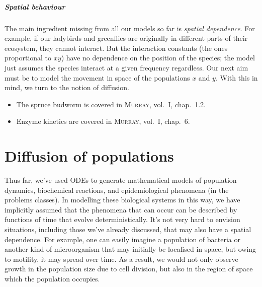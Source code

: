 \documentclass[main.tex]{subfiles}
\begin{document}
\paragraph{Spatial behaviour}
The main ingredient missing from all our models so far is \emph{spatial dependence}. For example, if our ladybirds and greenflies are originally in different parts of their ecosystem, they cannot interact. But the interaction constants (the ones proportional to $xy$) have no dependence on the position of the species; the model just assumes the species interact at a given frequency regardless. Our next aim must be to model the movement in space of the populations $x$ and $y$. With this in mind, we turn to the notion of diffusion.

\begin{extra-reading}
\begin{itemize}
	\item The spruce budworm is covered in \textsc{Murray}, vol.~I, chap.~1.2.
	\item Enzyme kinetics are covered in \textsc{Murray}, vol.~I, chap.~6.
\end{itemize}
\end{extra-reading}


\chapter{Diffusion of populations}
\label{chap:diffusion}

Thus far, we’ve used ODEs to generate mathematical models of population dynamics, biochemical reactions, and epidemiological phenomena (in the problems classes). In modelling these biological systems in this way, we have implicitly assumed that the phenomena that can occur can be described by functions of time that evolve deterministically. It’s not very hard to envision situations, including those we’ve already discussed, that may also have a spatial dependence. For example, one can easily imagine a population of bacteria or another kind of microorganism that may initially be localised in space, but owing to motility, it may spread over time. As a result, we would not only observe growth in the population size due to cell division, but also in the region of space which the population occupies.
\end{document}
